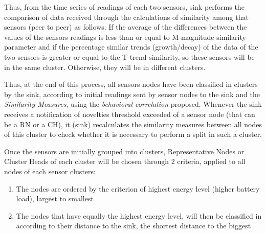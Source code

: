 \documentclass[conference]{IEEEtran}
\begin{document}
Thus, from the time series of readings of each two sensors, sink performs the
comparison of data received through the calculations of similarity among that
sensors (peer to peer) as follows:
If the average of the differences between the values of the sensors readings is
less than or equal to M-magnitude similarity parameter and if the percentage
similar trends (growth/decay) of the data of the two sensors is greater or equal
to the T-trend similarity, so these sensors will be in the same cluster.
Otherwise, they will be in different clusters.


Thus, at the end of this process, all sensors nodes have been classified in
clusters by the sink, according to initial readings sent by sensor nodes to the
sink and the \textit{Similarity Measures}, using the \textit{behavioral
correlation} proposed. Whenever the sink receives a notification of novelties
threshold exceeded of a sensor node (that can be a RN or a CH), it (sink)
recalculates the similarity measures between all nodes of this cluster to
check whether it is necessary to perform a split in such a cluster.

Once the sensors are initially grouped into clusters, Representative Nodes or
Cluster Heads of each cluster will be chosen through 2 criteria, applied to all
nodes of each sensor clusters:
\begin{enumerate}
    \item The nodes are ordered by the criterion of highest energy level (higher
    battery load), largest to smallest
    \item The nodes that have equally the highest energy level, will then be
    classified in according to their distance to the sink, the shortest distance
    to the biggest
 \end{enumerate}
\end{document}
